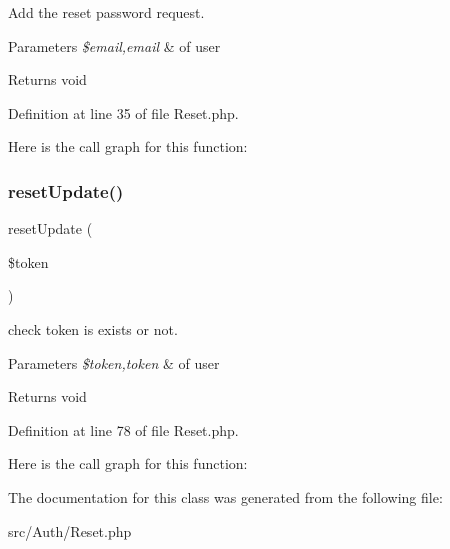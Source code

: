 Add the reset password request.


\begin{DoxyParams}{Parameters}
{\em \$email,email} & of user\\
\hline
\end{DoxyParams}
\begin{DoxyReturn}{Returns}
void 
\end{DoxyReturn}


Definition at line 35 of file Reset.\+php.

Here is the call graph for this function\+:
\mbox{\label{class_zest_1_1_auth_1_1_reset_ad64c08a9ce4e24a30b099d3bc0b4c892}} 
\subsubsection{\texorpdfstring{reset\+Update()}{resetUpdate()}}
{\footnotesize\ttfamily reset\+Update (\begin{DoxyParamCaption}\item[{}]{\$token }\end{DoxyParamCaption})}

check token is exists or not.


\begin{DoxyParams}{Parameters}
{\em \$token,token} & of user\\
\hline
\end{DoxyParams}
\begin{DoxyReturn}{Returns}
void 
\end{DoxyReturn}


Definition at line 78 of file Reset.\+php.

Here is the call graph for this function\+:


The documentation for this class was generated from the following file\+:\begin{DoxyCompactItemize}
\item 
src/\+Auth/Reset.\+php\end{DoxyCompactItemize}

